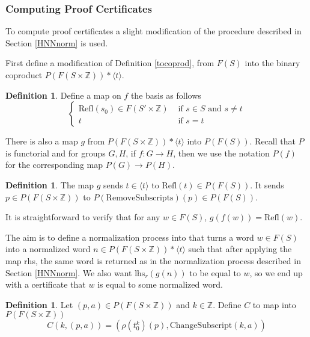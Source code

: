 \documentclass[12pt]{article} %
\theoremstyle{definition}
\theoremstyle{definition}
\theoremstyle{definition}
\theoremstyle{definition}
\newtheorem{defn}[thm]{Definition}
\begin{document}
\subsubsection{Computing Proof Certificates}\label{HNNPC}

To compute proof certificates a slight modification of the procedure described in Section
\ref{HNNnorm} is used.

First define a modification of Definition \ref{tocoprod}, from $F(S)$ into the binary
coproduct $P(F(S \times \mathbb{Z})) \ast \langle t \rangle$.

\begin{defn}\label{tocoprodP}
  Define a map on $f$ the basis as follows
  \begin{equation}
    \begin{cases}
      \text{Refl}(s_0) \in F(S' \times \mathbb{Z}) &
        \text{ if } s \in S \text{ and } s \ne t \\
      t & \text{ if } s = t
    \end{cases}
  \end{equation}
\end{defn}

There is also a map $g$ from $P(F(S \times \mathbb{Z})) \ast \langle t \rangle$ into
$P(F(S))$.
Recall that $P$ is functorial and for groups $G, H$, if $f : G \to H$, then we use the notation
$P(f)$ for the corresponding map $P(G) \to P(H)$.

\begin{defn}
  The map $g$ sends $t \in \langle t \rangle$ to $\text{Refl}(t) \in P(F(S))$.
  It sends $p \in P(F(S \times \mathbb{Z}))$ to $P(\text{RemoveSubscripts})(p) \in P(F(S))$.
\end{defn}

It is straightforward to verify that for any $w \in F(S)$, $g(f(w)) = \text{Refl}(w)$.

The aim is to define a normalization process into that turns a word $w \in F(S)$ into
a normalized word $n \in P(F(S \times \mathbb{Z})) \ast \langle t \rangle$
such that after applying the map rhs, the same word is returned as in the
normalization process described in Section \ref{HNNnorm}. We also want
$\text{lhs}_r(g(n))$ to be equal to $w$, so we end up with a certificate that $w$
is equal to some normalized word.

\begin{defn}\label{conjP}
  Let $(p, a) \in P(F(S \times \mathbb{Z}))$ and $k \in \mathbb{Z}$.
  Define $C$ to map into $P(F(S \times \mathbb{Z}))$
  \begin{equation}
    C(k, (p, a)) = (\rho(t_0^k)(p), \text{ChangeSubscript}(k, a))
  \end{equation}
\end{defn}
\end{document}
